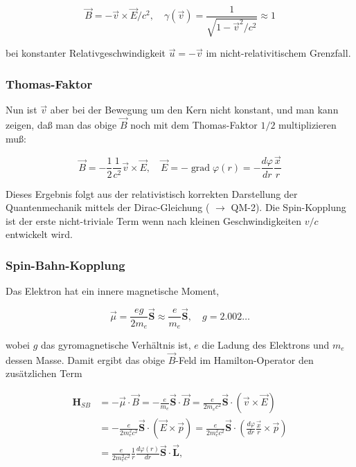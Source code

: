 \documentclass[10pt, letterpaper]{article}
\begin{document}
$$
\vec{B}=-\vec{v} \times \vec{E} / c^{2}, \quad \gamma(\vec{v})=\frac{1}{\sqrt{1-\vec{v}^{2} / c^{2}}} \approx 1
$$

bei konstanter Relativgeschwindigkeit $\vec{u}=-\vec{v}$ im nicht-relativitischem Grenzfall.

\subsubsection*{Thomas-Faktor}
Nun ist $\vec{v}$ aber bei der Bewegung um den Kern nicht konstant, und man kann zeigen, daß man das obige $\vec{B}$ noch mit dem Thomas-Faktor $1 / 2$ multiplizieren muß:

$$
\vec{B}=-\frac{1}{2} \frac{1}{c^{2}} \vec{v} \times \vec{E}, \quad \vec{E}=-\operatorname{grad} \varphi(r)=-\frac{d \varphi}{d r} \frac{\vec{x}}{r}
$$

Dieses Ergebnis folgt aus der relativistisch korrekten Darstellung der Quantenmechanik mittels der Dirac-Gleichung ( $\rightarrow$ QM-2). Die Spin-Kopplung ist der erste nicht-triviale Term wenn nach kleinen Geschwindigkeiten $v / c$ entwickelt wird.

\subsubsection*{Spin-Bahn-Kopplung}
Das Elektron hat ein innere magnetische Moment,

$$
\vec{\mu}=\frac{e g}{2 m_{e}} \overrightarrow{\mathbf{S}} \approx \frac{e}{m_{e}} \overrightarrow{\mathbf{S}}, \quad g=2.002 \ldots
$$

wobei $g$ das gyromagnetische Verhältnis ist, $e$ die Ladung des Elektrons und $m_{e}$ dessen Masse. Damit ergibt das obige $\vec{B}$-Feld im Hamilton-Operator den zusätzlichen Term

$$
\begin{aligned}
\mathbf{H}_{S B} & =-\vec{\mu} \cdot \vec{B}=-\frac{e}{m_{e}} \overrightarrow{\mathbf{S}} \cdot \vec{B}=\frac{e}{2 m_{e} c^{2}} \overrightarrow{\mathbf{S}} \cdot(\vec{v} \times \vec{E}) \\
& =-\frac{e}{2 m_{e}^{2} c^{2}} \overrightarrow{\mathbf{S}} \cdot(\vec{E} \times \vec{p})=\frac{e}{2 m_{e}^{2} c^{2}} \overrightarrow{\mathbf{S}} \cdot\left(\frac{d \varphi}{d r} \frac{\vec{x}}{r} \times \vec{p}\right) \\
& =\frac{e}{2 m_{e}^{2} c^{2}} \frac{1}{r} \frac{d \varphi(r)}{d r} \overrightarrow{\mathbf{S}} \cdot \overrightarrow{\mathbf{L}},
\end{aligned}
$$
\end{document}
